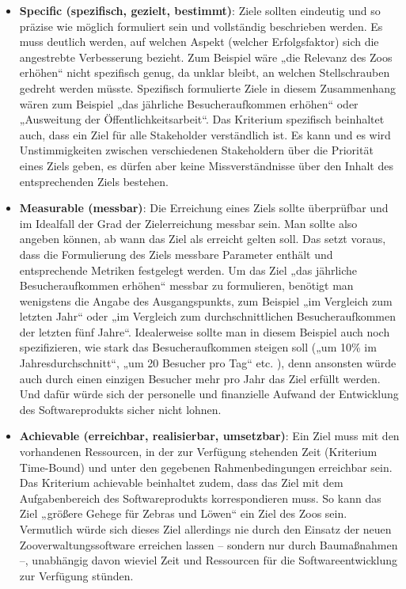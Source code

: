 \begin{itemize}
	\item \textbf{Specific (spezifisch, gezielt, bestimmt)}: Ziele sollten eindeutig und so präzise wie möglich formuliert sein und vollständig beschrieben werden. Es muss deutlich werden, auf welchen Aspekt (\zb welcher Erfolgsfaktor) sich die angestrebte Verbesserung bezieht. Zum Beispiel wäre „die Relevanz des Zoos erhöhen“ nicht spezifisch genug, da unklar bleibt, an welchen Stellschrauben gedreht werden müsste. Spezifisch formulierte Ziele in diesem Zusammenhang wären zum Beispiel „das jährliche Besucheraufkommen erhöhen“ oder „Ausweitung der Öffentlichkeitsarbeit“. Das Kriterium spezifisch beinhaltet auch, dass ein Ziel für alle Stakeholder verständlich ist. Es kann und es wird Unstimmigkeiten zwischen verschiedenen Stakeholdern über die Priorität eines Ziels geben, es dürfen aber keine Missverständnisse über den Inhalt des entsprechenden Ziels bestehen.

	\vspace{2.3mm} %

	\item \textbf{Measurable (messbar)}: Die Erreichung eines Ziels sollte überprüfbar und im Idealfall der Grad der Zielerreichung messbar sein. Man sollte also angeben können, ab wann das Ziel als erreicht gelten soll. Das setzt voraus, dass die Formulierung des Ziels messbare Parameter enthält und entsprechende Metriken festgelegt werden. Um das Ziel „das jährliche Besucheraufkommen erhöhen“ messbar zu formulieren, benötigt man wenigstens die Angabe des Ausgangspunkts, zum Beispiel „im Vergleich zum letzten Jahr“ oder „im Vergleich zum durchschnittlichen Besucheraufkommen der letzten fünf Jahre“. Idealerweise sollte man in diesem Beispiel auch noch spezifizieren, wie stark das Besucheraufkommen steigen soll („um 10\% im Jahresdurchschnitt“, „um 20 Besucher pro Tag“ etc. ), denn ansonsten würde auch durch einen einzigen Besucher mehr pro Jahr das Ziel erfüllt werden. Und dafür würde sich der personelle und finanzielle Aufwand der Entwicklung des Softwareprodukts sicher nicht lohnen. 
	
	\vspace{2.3mm} %

	\item \textbf{Achievable (erreichbar, realisierbar, umsetzbar)}: Ein Ziel muss mit den vorhandenen Ressourcen, in der zur Verfügung stehenden Zeit (\su Kriterium Time-Bound) und unter den gegebenen Rahmenbedingungen erreichbar sein. Das Kriterium achievable beinhaltet zudem, dass das Ziel mit dem Aufgabenbereich des Softwareprodukts korrespondieren muss. So kann das Ziel „größere Gehege für Zebras und Löwen“ ein Ziel des Zoos sein. Vermutlich würde sich dieses Ziel allerdings nie durch den Einsatz der neuen Zooverwaltungssoftware erreichen lassen -- sondern nur durch Baumaßnahmen --, unabhängig davon wieviel Zeit und Ressourcen für die Softwareentwicklung zur Verfügung stünden.
	

\end{itemize}

